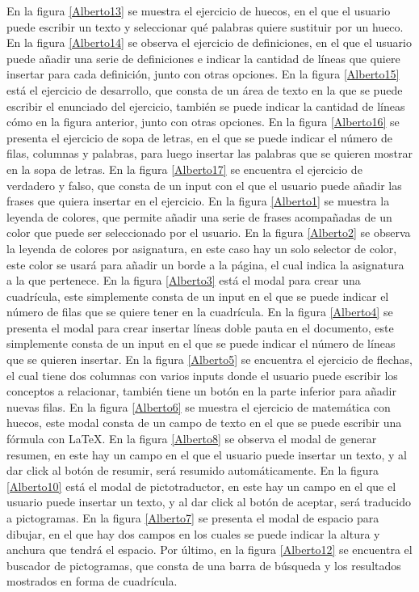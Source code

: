 En la figura \ref{Alberto13} se muestra el ejercicio de huecos, en el que el usuario puede escribir un texto y seleccionar qué palabras quiere sustituir por un hueco. En la figura \ref{Alberto14} se observa el ejercicio de definiciones, en el que el usuario puede añadir una serie de definiciones e indicar la cantidad de líneas que quiere insertar para cada definición, junto con otras opciones. En la figura \ref{Alberto15} está el ejercicio de desarrollo, que consta de un área de texto en la que se puede escribir el enunciado del ejercicio, también se puede indicar la cantidad de líneas cómo en la figura anterior, junto con otras opciones. En la figura \ref{Alberto16} se presenta el ejercicio de sopa de letras, en el que se puede indicar el número de filas, columnas y palabras, para luego insertar las palabras que se quieren mostrar en la sopa de letras. En la figura \ref{Alberto17} se encuentra el ejercicio de verdadero y falso, que consta de un input con el que el usuario puede añadir las frases que quiera insertar en el ejercicio. En la figura \ref{Alberto1} se muestra la leyenda de colores, que permite añadir una serie de frases acompañadas de un color que puede ser seleccionado por el usuario. En la figura \ref{Alberto2} se observa la leyenda de colores por asignatura, en este caso hay un solo selector de color, este color se usará para añadir un borde a la página, el cual indica la asignatura a la que pertenece. En la figura \ref{Alberto3} está el modal para crear una cuadrícula, este simplemente consta de un input en el que se puede indicar el número de filas que se quiere tener en la cuadrícula. En la figura \ref{Alberto4} se presenta el modal para crear insertar líneas doble pauta en el documento, este simplemente consta de un input en el que se puede indicar el número de líneas que se quieren insertar. En la figura \ref{Alberto5} se encuentra el ejercicio de flechas, el cual tiene dos columnas con varios inputs donde el usuario puede escribir los conceptos a relacionar, también tiene un botón en la parte inferior para añadir nuevas filas. En la figura \ref{Alberto6} se muestra el ejercicio de matemática con huecos, este modal consta de un campo de texto en el que se puede escribir una fórmula con LaTeX. En la figura \ref{Alberto8} se observa el modal de generar resumen, en este hay un campo en el que el usuario puede insertar un texto, y al dar click al botón de resumir, será resumido automáticamente. En la figura \ref{Alberto10} está el modal de pictotraductor, en este hay un campo en el que el usuario puede insertar un texto, y al dar click al botón de aceptar, será traducido a pictogramas. En la figura \ref{Alberto7} se presenta el modal de espacio para dibujar, en el que hay dos campos en los cuales se puede indicar la altura y anchura que tendrá el espacio. Por último, en la figura \ref{Alberto12} se encuentra el buscador de pictogramas, que consta de una barra de búsqueda y los resultados mostrados en forma de cuadrícula.


